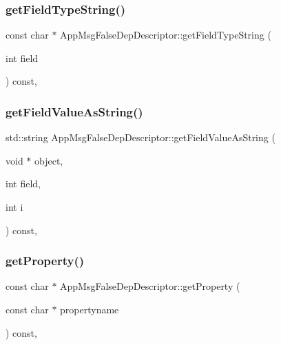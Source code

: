 \subsubsection{\texorpdfstring{get\+Field\+Type\+String()}{getFieldTypeString()}}
{\footnotesize\ttfamily const char $\ast$ App\+Msg\+False\+Dep\+Descriptor\+::get\+Field\+Type\+String (\begin{DoxyParamCaption}\item[{int}]{field }\end{DoxyParamCaption}) const\hspace{0.3cm}{\ttfamily [override]}, {\ttfamily [virtual]}}

\mbox{\label{classAppMsgFalseDepDescriptor_ac9b26b1e9c849df0e0259dfa3a38885c}} 
\subsubsection{\texorpdfstring{get\+Field\+Value\+As\+String()}{getFieldValueAsString()}}
{\footnotesize\ttfamily std\+::string App\+Msg\+False\+Dep\+Descriptor\+::get\+Field\+Value\+As\+String (\begin{DoxyParamCaption}\item[{void $\ast$}]{object,  }\item[{int}]{field,  }\item[{int}]{i }\end{DoxyParamCaption}) const\hspace{0.3cm}{\ttfamily [override]}, {\ttfamily [virtual]}}

\mbox{\label{classAppMsgFalseDepDescriptor_ac5650d0cbf554966c9fa8a1add231af7}} 
\subsubsection{\texorpdfstring{get\+Property()}{getProperty()}}
{\footnotesize\ttfamily const char $\ast$ App\+Msg\+False\+Dep\+Descriptor\+::get\+Property (\begin{DoxyParamCaption}\item[{const char $\ast$}]{propertyname }\end{DoxyParamCaption}) const\hspace{0.3cm}{\ttfamily [override]}, {\ttfamily [virtual]}}

